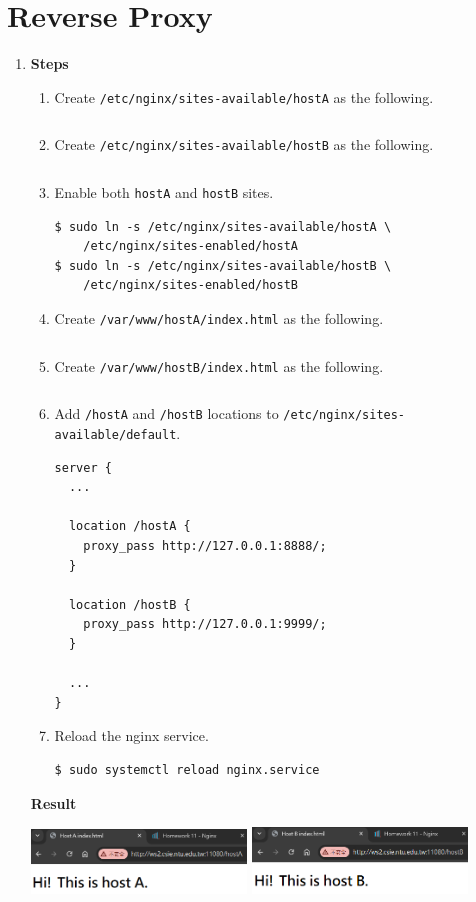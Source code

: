 \documentclass[12pt, a4paper]{article}
\begin{document}
  \section*{Reverse Proxy}
  \begin{enumerate}[resume]
    \item \textbf{Steps}
    \begin{enumerate}[label=(\arabic*)]
      \item Create \verb|/etc/nginx/sites-available/hostA| as the following.
      \inputminted{nginx}{server/etc/nginx/sites-available/hostA}
      \item Create \verb|/etc/nginx/sites-available/hostB| as the following.
      \inputminted{nginx}{server/etc/nginx/sites-available/hostB}
      \item Enable both \verb|hostA| and \verb|hostB| sites.
      \begin{Verbatim}[frame=single]
$ sudo ln -s /etc/nginx/sites-available/hostA \
    /etc/nginx/sites-enabled/hostA
$ sudo ln -s /etc/nginx/sites-available/hostB \
    /etc/nginx/sites-enabled/hostB
      \end{Verbatim}
      \item Create \verb|/var/www/hostA/index.html| as the following.
      \inputminted{html}{server/var/www/hostA/index.html}
      \item Create \verb|/var/www/hostB/index.html| as the following.
      \inputminted{html}{server/var/www/hostB/index.html}
      \item Add \verb|/hostA| and \verb|/hostB| locations to
      \verb|/etc/nginx/sites-available/default|.
      \begin{Verbatim}[frame=single]
server {
  ...

  location /hostA {
    proxy_pass http://127.0.0.1:8888/;
  }

  location /hostB {
    proxy_pass http://127.0.0.1:9999/;
  }

  ...
}
      \end{Verbatim}
      \item Reload the nginx service.
      \begin{Verbatim}[frame=single]
$ sudo systemctl reload nginx.service
      \end{Verbatim}
    \end{enumerate}

    \textbf{Result}

    \includegraphics[width=0.45\textwidth]{13_hostA.png}
    \includegraphics[width=0.45\textwidth]{13_hostB.png}


\end{enumerate}
\end{document}

